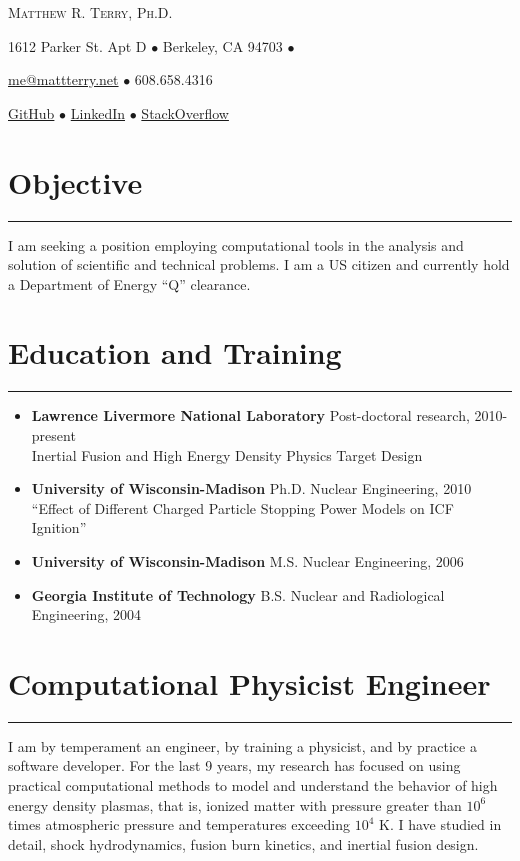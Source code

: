 \documentclass[letterpaper,11pt]{article}
\def\name{Matthew R. Terry, Ph.D.}
\newcommand{\sectionline}{\vspace{-0.05in}\hrule\vspace{0.05in}}
\begin{document}
\begin{center}
	{\huge\scshape \name}

	1612 Parker St. Apt D $\bullet$
	Berkeley, CA 94703 $\bullet$

	\href{mailto:me@mattterry.net}{me@mattterry.net}  $\bullet$
	608.658.4316

	\hyperref[https://github.com/mrterry]{GitHub}  $\bullet$
	\hyperref[http://www.linkedin.com/pub/matt-terry/a/758/61b/]{LinkedIn} $\bullet$
	\hyperref[http://careers.stackoverflow.com/cv/edit/178262]{StackOverflow}
\end{center}

\section*{Objective}
\sectionline
I am seeking a position employing computational tools in the analysis and
solution of scientific and technical problems.  I am a US citizen and currently
hold a Department of Energy ``Q'' clearance.

\section*{Education and Training}
\sectionline
\begin{itemize}
	\item
		\textbf{Lawrence Livermore National Laboratory} Post-doctoral research, 2010-present \\
		Inertial Fusion and High Energy Density Physics Target Design
	\item 
		\textbf{University of Wisconsin-Madison} Ph.D. Nuclear Engineering, 2010 \\
		``Effect of Different Charged Particle Stopping Power Models on ICF Ignition''
	\item 
		\textbf{University of Wisconsin-Madison} M.S. Nuclear Engineering, 2006
	\item 
		\textbf{Georgia Institute of Technology} B.S. Nuclear and Radiological Engineering, 2004
\end{itemize}

\section*{Computational Physicist Engineer}
\sectionline
I am by temperament an engineer, by training a physicist, and by practice a
software developer.  For the last 9 years, my research has focused on using
practical
computational methods to model and understand the behavior of high energy
density plasmas, that is, ionized matter with pressure greater than $10^6$ times atmospheric
pressure and temperatures exceeding $10^4$ K.  I have studied in detail, shock hydrodynamics,
fusion burn kinetics, and inertial fusion design.
\end{document}
